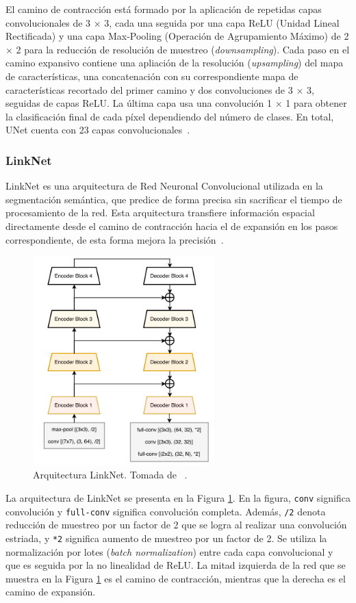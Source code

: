 El camino de contracción está formado por la aplicación de repetidas capas convolucionales de 3 $\times$ 3, cada una seguida por una capa ReLU (Unidad Lineal Rectificada) y una capa Max-Pooling (Operación de Agrupamiento Máximo) de 2 $\times$ 2 para la reducción de resolución de muestreo (\textit{downsampling}). Cada paso en el camino expansivo contiene una apliación de la resolución (\textit{upsampling}) del mapa de características, una concatenación con su correspondiente mapa de características recortado del primer camino y dos convoluciones de 3 $\times$ 3, seguidas de capas ReLU. La última capa usa una convolución 1 $\times$ 1 para obtener la clasificación final de cada píxel dependiendo del número de clases. En total, UNet cuenta con 23 capas convolucionales~\cite{ronneberger2015u}.

\subsubsection{LinkNet}

LinkNet es una arquitectura de Red Neuronal Convolucional utilizada en la segmentación semántica, que predice de forma precisa sin sacrificar el tiempo de procesamiento de la red. Esta arquitectura transfiere información espacial directamente desde el camino de contracción hacia el de expansión en los pasos correspondiente, de esta forma mejora la precisión~\cite{chaurasia2017linknet}.

\begin{figure}[ht]
	\centering
	\includegraphics[width=7cm]{./Graphics/linknet.png}
	\caption{Arquitectura LinkNet. Tomada de ~\cite{chaurasia2017linknet}.}
	\label{fig:linknet}
\end{figure}

La arquitectura de LinkNet se presenta en la Figura \ref{fig:linknet}. En la figura, \verb|conv| significa convolución y \verb|full-conv| significa convolución completa. Además, \verb|/2| denota reducción de muestreo por un factor de 2 que se logra al realizar una convolución estriada, y \verb|*2| significa aumento de muestreo por un factor de 2. Se utiliza la normalización por lotes (\textit{batch normalization}) entre cada capa convolucional y que es seguida por la no linealidad de ReLU. La mitad izquierda de la red que se muestra en la Figura \ref{fig:linknet} es el camino de contracción, mientras que la derecha es el camino de expansión.

